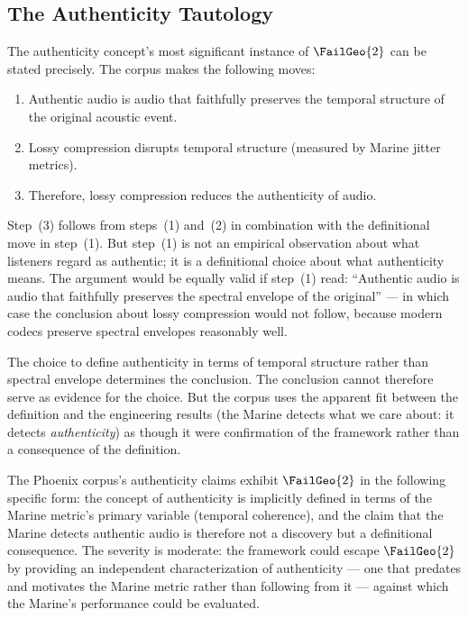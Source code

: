 \subsection{The Authenticity Tautology}

The authenticity concept's most significant instance of
$\FailGeo{2}$ can be stated precisely. The corpus makes
the following moves:

\begin{enumerate}
  \item Authentic audio is audio that faithfully preserves
  the temporal structure of the original acoustic event.
  \item Lossy compression disrupts temporal structure
  (measured by Marine jitter metrics).
  \item Therefore, lossy compression reduces the
  authenticity of audio.
\end{enumerate}

Step~(3) follows from steps~(1) and~(2) in combination
with the definitional move in step~(1). But step~(1)
is not an empirical observation about what listeners
regard as authentic; it is a definitional choice about
what authenticity means. The argument would be equally
valid if step~(1) read: ``Authentic audio is audio
that faithfully preserves the spectral envelope of
the original'' --- in which case the conclusion about
lossy compression would not follow, because modern
codecs preserve spectral envelopes reasonably well.

The choice to define authenticity in terms of temporal
structure rather than spectral envelope determines the
conclusion. The conclusion cannot therefore serve as
evidence for the choice. But the corpus uses the
apparent fit between the definition and the engineering
results (the Marine detects what we care about: it
detects \emph{authenticity}) as though it were
confirmation of the framework rather than a consequence
of the definition.

\begin{auditprop}
\label{ap:fg2-authenticity}
The Phoenix corpus's authenticity claims exhibit
$\FailGeo{2}$ in the following specific form: the
concept of authenticity is implicitly defined in terms
of the Marine metric's primary variable (temporal
coherence), and the claim that the Marine detects
authentic audio is therefore not a discovery but a
definitional consequence. The severity is moderate:
the framework could escape $\FailGeo{2}$ by providing
an independent characterization of authenticity ---
one that predates and motivates the Marine metric
rather than following from it --- against which the
Marine's performance could be evaluated.
\end{auditprop}

